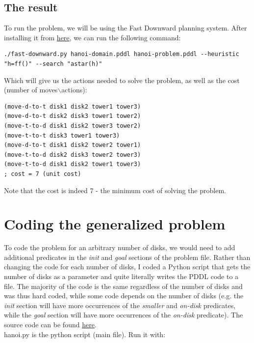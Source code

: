 \documentclass{article}
\begin{document}
\subsection{The result}
To run the problem, we will be using the Fast Downward planning system. After installing it from \href{https://www.fast-downward.org/ObtainingAndRunningFastDownward}{here}, we can run the following command:

\begin{lstlisting}[breaklines=true]
    ./fast-downward.py hanoi-domain.pddl hanoi-problem.pddl --heuristic "h=ff()" --search "astar(h)"
\end{lstlisting}

Which will give us the actions needed to solve the problem, as well as the cost (number of moves$\backslash$actions):

\begin{lstlisting}
(move-d-to-t disk1 disk2 tower1 tower3)
(move-d-to-t disk2 disk3 tower1 tower2)
(move-t-to-d disk1 disk2 tower3 tower2)
(move-t-to-t disk3 tower1 tower3)
(move-d-to-t disk1 disk2 tower2 tower1)
(move-t-to-d disk2 disk3 tower2 tower3)
(move-t-to-d disk1 disk2 tower1 tower3)
; cost = 7 (unit cost)
\end{lstlisting}

Note that the cost is indeed 7 - the minimum cost of solving the problem.

\section{Coding the generalized problem}
To code the problem for an arbitrary number of disks, we would need to add additional predicates in the \emph{init} and \emph{goal} sections of the problem file. Rather than changing the code for each number of disks, I coded a Python script that gets the number of disks as a parameter and quite literally writes the PDDL code to a file. The majority of the code is the same regardless of the number of disks and was thus hard coded, while some code depends on the number of disks (e.g. the \emph{init} section will have more occurrences of the \emph{smaller} and \emph{on-disk} predicates, while the \emph{goal} section will have more occurrences of the \emph{on-disk} predicate). The source code can be found \href{https://github.com/mihnea-tirca/Solving-Tower-of-Hanoi-in-PDDL}{here}.\\

\noindent
hanoi.py is the python script (main file). Run it with:
\end{document}
